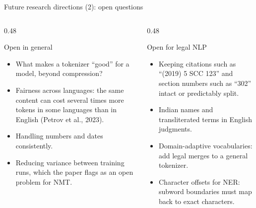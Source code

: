 \documentclass[aspectratio=169,11pt]{beamer}
\begin{document}
\begin{frame}{Future research directions (2): open questions}
  \begin{columns}[T]
    \begin{column}{0.48\textwidth}
      \begin{block}{Open in general}
        \small
        \begin{itemize}
          \item What makes a tokenizer ``good'' for a model, beyond compression?
          \item Fairness across languages: the same content can cost several times more tokens in some languages than in English (Petrov et al., 2023).
          \item Handling numbers and dates consistently.
          \item Reducing variance between training runs, which the paper flags as an open problem for NMT.
        \end{itemize}
      \end{block}
    \end{column}
    \begin{column}{0.48\textwidth}
      \begin{exampleblock}{Open for legal NLP}
        \small
        \begin{itemize}
          \item Keeping citations such as ``(2019) 5 SCC 123'' and section numbers such as ``302'' intact or predictably split.
          \item Indian names and transliterated terms in English judgments.
          \item Domain-adaptive vocabularies: add legal merges to a general tokenizer.
          \item Character offsets for NER: subword boundaries must map back to exact characters.
        \end{itemize}
      \end{exampleblock}
    \end{column}
  \end{columns}
\end{frame}
\end{document}

